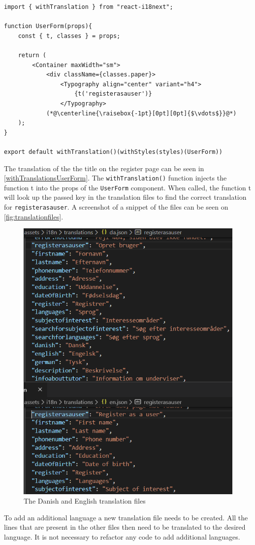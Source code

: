 \begin{lstlisting}[caption={Translated header when registering as a user.}, captionpos=b, label={withTranslationsUserForm}]
import { withTranslation } from "react-i18next";

function UserForm(props){
    const { t, classes } = props;

    return (
        <Container maxWidth="sm">
            <div className={classes.paper}>
                <Typography align="center" variant="h4">
                    {t('registerasauser')}
                </Typography>
            (*@\centerline{\raisebox{-1pt}[0pt][0pt]{$\vdots$}}@*)
    );
}

export default withTranslation()(withStyles(styles)(UserForm))
\end{lstlisting}
\noindent
The translation of the the title on the register page can be seen in \autoref{withTranslationsUserForm}.
The \texttt{withTranslation()} function injects the function t into the props of the \texttt{UserForm} component.
When called, the function t will look up the passed key in the translation files to find the correct translation for \texttt{registerasauser}. 
A screenshot of a snippet of the files can be seen on \autoref{fig:translationfiles}.
\begin{figure}
    \centering
    \includegraphics[scale=0.5]{figures/translationexample.PNG}
    \caption{The Danish and English translation files}
    \label{fig:translationfiles}
\end{figure}
\noindent
To add an additional language a new translation file needs to be created.
All the lines that are present in the other files then need to be translated to the desired language. 
It is not necessary to refactor any code to add additional languages.
